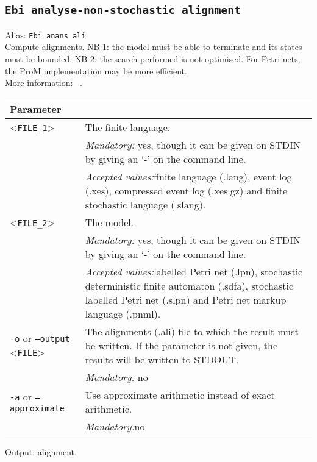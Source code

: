 {\subsection{\texttt{Ebi analyse-non-stochastic alignment}}
\label{command:Ebi analyse-non-stochastic alignment}
Alias: \texttt{Ebi anans ali}.\\
Compute alignments.
NB 1: the model must be able to terminate and its states must be bounded.
NB 2: the search performed is not optimised. For Petri nets, the ProM implementation may be more efficient.\\
More information: ~\cite{DBLP:conf/edoc/AdriansyahDA11}.\\
\begin{tabularx}{\linewidth}{lX}
\toprule
Parameter \\\midrule
<\texttt{FILE\_1}>&The finite language.\\
&\textit{Mandatory:} \quad yes, though it can be given on STDIN by giving an `-' on the command line.\\
&\textit{Accepted values:}\quad finite language (.lang), event log (.xes), compressed event log (.xes.gz) and finite stochastic language (.slang).\\
<\texttt{FILE\_2}>&The model.\\
&\textit{Mandatory:} \quad yes, though it can be given on STDIN by giving an `-' on the command line.\\
&\textit{Accepted values:}\quad labelled Petri net (.lpn), stochastic deterministic finite automaton (.sdfa), stochastic labelled Petri net (.slpn) and Petri net markup language (.pnml).\\
\texttt{-o} or \texttt{--output} <\texttt{FILE}> &
The alignments (.ali) file to which the result must be written. If the parameter is not given, the results will be written to STDOUT.\\
&\textit{Mandatory:} \quad no\\
\texttt{-a} or \texttt{--approximate} & Use approximate arithmetic instead of exact arithmetic.\\
&\textit{Mandatory:}\quad no\\
\bottomrule
\end{tabularx}
Output: alignment.
}
